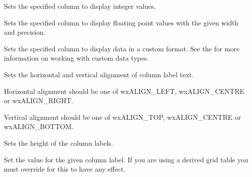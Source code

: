 \label{wxgridsetcolformatnumber}


Sets the specified column to display integer values.



\label{wxgridsetcolformatfloat}


Sets the specified column to display floating point values with the given width and precision.



\label{wxgridsetcolformatcustom}


Sets the specified column to display data in a custom format.
See the  for more information on working
with custom data types.



\label{wxgridsetcollabelalignment}


Sets the horizontal and vertical alignment of column label text.

Horizontal alignment should be one of wxALIGN\_LEFT, wxALIGN\_CENTRE or wxALIGN\_RIGHT.

Vertical alignment should be one of wxALIGN\_TOP, wxALIGN\_CENTRE or wxALIGN\_BOTTOM.



\label{wxgridsetcollabelsize}


Sets the height of the column labels.



\label{wxgridsetcollabelvalue}


Set the value for the given column label. If you are using a derived grid table you must
override 
for this to have any effect.



